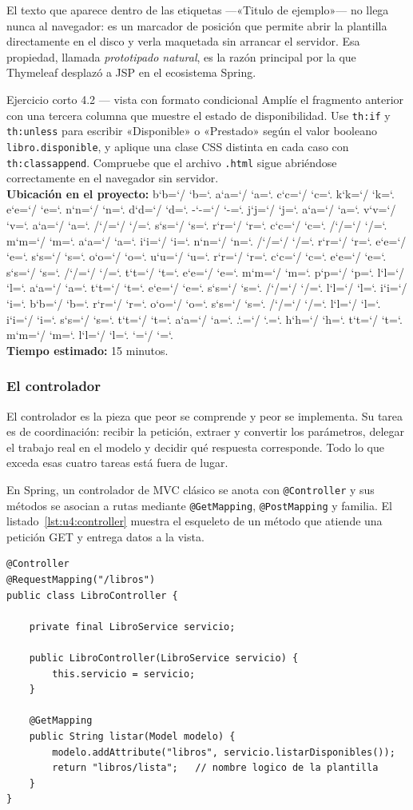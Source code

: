 \documentclass[11pt,a4paper,openany]{book}
\newcommand{\ruta}[1]{{\ttfamily\small\rutaaux #1\relax}}
\def\rutaaux{\futurelet\next\rutapaso}
\def\rutapaso{%
	\ifx\next\relax \let\sig\relax
	\else \let\sig\rutaimprime \fi \sig}
\def\rutaimprime#1{%
	#1\ifnum`#1=`/ \allowbreak\fi
	\ifnum`#1=`. \allowbreak\fi
	\rutaaux}
\begin{document}
El texto que aparece dentro de las etiquetas ---«Titulo de ejemplo»--- no llega nunca al navegador: es un marcador de posición que permite abrir la plantilla directamente en el disco y verla maquetada sin arrancar el servidor. Esa propiedad, llamada \emph{prototipado natural}, es la razón principal por la que Thymeleaf desplazó a JSP en el ecosistema Spring.

\begin{cajaejercicio}{Ejercicio corto 4.2 --- vista con formato condicional}
	Amplíe el fragmento anterior con una tercera columna que muestre el estado de disponibilidad. Use \texttt{th:if} y \texttt{th:unless} para escribir «Disponible» o «Prestado» según el valor booleano \texttt{libro.disponible}, y aplique una clase CSS distinta en cada caso con \texttt{th:classappend}. Compruebe que el archivo \texttt{.html} sigue abriéndose correctamente en el navegador sin servidor.\\[3pt]
	\textbf{Ubicación en el proyecto:} \ruta{backend-java/src/main/resources/templates/libros/lista.html}\\[3pt]
	\textbf{Tiempo estimado:} 15 minutos.
\end{cajaejercicio}

\subsubsection{El controlador}

El controlador es la pieza que peor se comprende y peor se implementa. Su tarea es de coordinación: recibir la petición, extraer y convertir los parámetros, delegar el trabajo real en el modelo y decidir qué respuesta corresponde. Todo lo que exceda esas cuatro tareas está fuera de lugar.

En Spring, un controlador de MVC clásico se anota con \texttt{@Controller} y sus métodos se asocian a rutas mediante \texttt{@GetMapping}, \texttt{@PostMapping} y familia. El listado~\ref{lst:u4:controller} muestra el esqueleto de un método que atiende una petición GET y entrega datos a la vista.

\begin{lstlisting}[style=java,caption={Metodo de controlador que delega en el servicio y entrega datos al modelo de vista.},label={lst:u4:controller}]
@Controller
@RequestMapping("/libros")
public class LibroController {

	private final LibroService servicio;

	public LibroController(LibroService servicio) {
		this.servicio = servicio;
	}

	@GetMapping
	public String listar(Model modelo) {
		modelo.addAttribute("libros", servicio.listarDisponibles());
		return "libros/lista";   // nombre logico de la plantilla
	}
}
\end{lstlisting}
\end{document}
